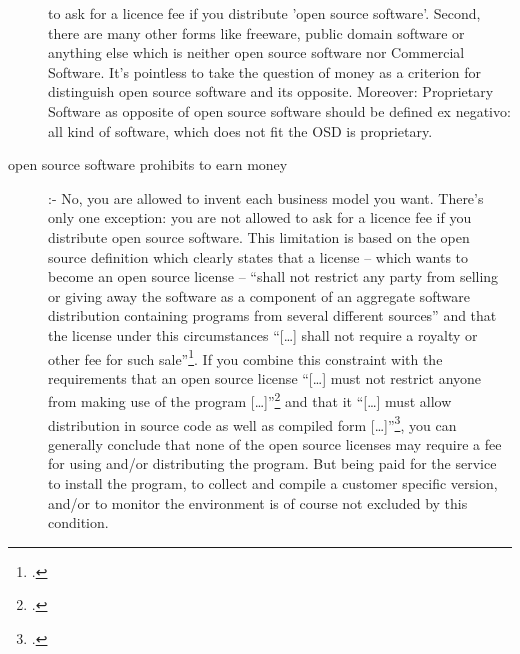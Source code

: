 \begin{description}
  to ask for a licence fee if you distribute 'open source software'. Second,
  there are many other forms like freeware, public domain software or anything
  else which is neither open source software nor Commercial Software. It's
  pointless to take the question of money as a criterion for distinguish open
  source software and its opposite. Moreover: Proprietary Software as opposite
  of open source software should be defined ex negativo: all kind of software,
  which does not fit the OSD is proprietary.
  \item[open source software prohibits to earn money] :- No, you are allowed to
  invent each business model you want. There's only one exception: you are not
  allowed to ask for a licence fee if you distribute open source software. This
  limitation is based on the open source definition which clearly states that a
  license -- which wants to become an open source license -- \enquote{shall not
  restrict any party from selling or giving away the software as a component of
  an aggregate software distribution containing programs from several different
  sources} and that the license under this circumstances \enquote{[\ldots] shall
  not require a royalty or other fee for such sale}\footcite[cf.][§1]{OSI2012a}.
  If you combine this constraint with the requirements that an open source
  license \enquote{[\ldots] must not restrict anyone from making use of the
  program [\ldots]}\footcite[cf.][§6]{OSI2012a} and that it \enquote{[\ldots]
  must allow distribution in source code as well as compiled form
  [\ldots]}\footcite[cf.][§2]{OSI2012a}, you can generally conclude that none of
  the open source licenses may require a fee for using and/or distributing the
  program. But being paid for the service to install the program, to collect
  and compile a customer specific version, and/or to monitor the environment is
  of course not excluded by this condition.
  

\end{description}

